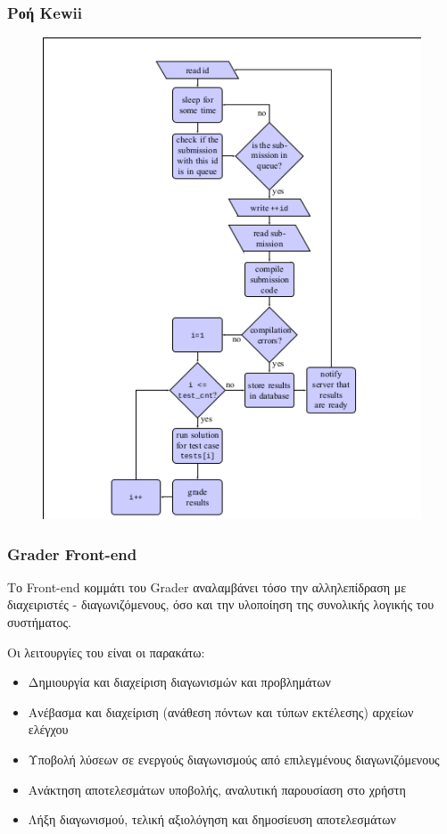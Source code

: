 \documentclass{beamer}
\begin{document}
\begin{frame}
  \frametitle{Ροή Kewii}

  \begin{figure}
    \includegraphics[scale=0.37,trim=4 4 4 4,clip]{../Figures/graderflow.png}
  \end{figure}
\end{frame}


\begin{frame}
  \frametitle{Grader Front-end}

  Το Front-end κομμάτι του Grader αναλαμβάνει τόσο την αλληλεπίδραση με
  διαχειριστές - διαγωνιζόμενους, όσο και την υλοποίηση της συνολικής λογικής
  του συστήματος.

  \bigskip

  Οι λειτουργίες του είναι οι παρακάτω:
  \begin{itemize}
      \item Δημιουργία και διαχείριση διαγωνισμών και προβλημάτων
      \item Ανέβασμα και διαχείριση (ανάθεση πόντων και τύπων εκτέλεσης) αρχείων ελέγχου
      \item Υποβολή λύσεων σε ενεργούς διαγωνισμούς από επιλεγμένους διαγωνιζόμενους
      \item Ανάκτηση αποτελεσμάτων υποβολής, αναλυτική παρουσίαση στο χρήστη
      \item Λήξη διαγωνισμού, τελική αξιολόγηση και δημοσίευση αποτελεσμάτων
  \end{itemize}
\end{frame}
\end{document}
